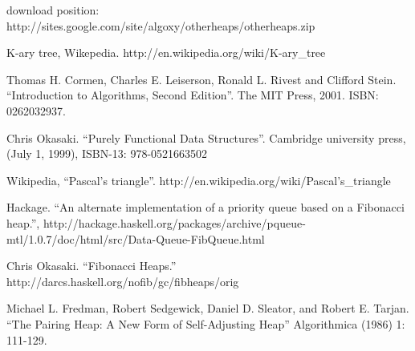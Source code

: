 \documentclass{article}
\begin{document}
download position: http://sites.google.com/site/algoxy/otherheaps/otherheaps.zip

\begin{thebibliography}{99}

K-ary tree, Wikepedia. http://en.wikipedia.org/wiki/K-ary\_tree

Thomas H. Cormen, Charles E. Leiserson, Ronald L. Rivest and Clifford Stein. ``Introduction to Algorithms, Second Edition''. The MIT Press, 2001. ISBN: 0262032937.

Chris Okasaki. ``Purely Functional Data Structures''. Cambridge university press, (July 1, 1999), ISBN-13: 978-0521663502

Wikipedia, ``Pascal's triangle''. http://en.wikipedia.org/wiki/Pascal's\_triangle

Hackage. ``An alternate implementation of a priority queue based on a Fibonacci heap.'', http://hackage.haskell.org/packages/archive/pqueue-mtl/1.0.7/doc/html/src/Data-Queue-FibQueue.html

Chris Okasaki. ``Fibonacci Heaps.'' http://darcs.haskell.org/nofib/gc/fibheaps/orig

Michael L. Fredman, Robert Sedgewick, Daniel D. Sleator, and Robert E. Tarjan. ``The Pairing Heap: A New Form of Self-Adjusting Heap'' Algorithmica (1986) 1: 111-129.

\end{thebibliography}

\ifx\wholebook\relax \else
\end{document}
